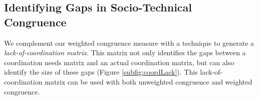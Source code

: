 
%	


\subsection{Identifying Gaps in Socio-Technical Congruence}
\label{sec:lack}

We complement our
weighted congruence measure with a technique to generate a \emph{lack-of-coordination matrix}. This matrix not only identifies the
gaps between a coordination needs matrix and an actual coordination matrix, but can also identify the size of these gaps (Figure \ref{subfig:coordLack}). This lack-of-coordination matrix can be used with both unweighted congruence and weighted congruence.

